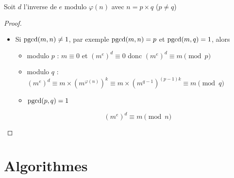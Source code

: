 \begin{frame}

\begin{lemme}
Soit $d$ l'inverse de $e$ modulo $\varphi(n)$ avec $n=p\times q$ \quad ($p\not= q$)
\end{lemme}



\begin{proof}
\begin{itemize}
  \item Si $\mathop{\text{pgcd}}\nolimits(m,n)\not=1$, par exemple $\mathop{\text{pgcd}}\nolimits(m,n)=p$ et $\mathop{\text{pgcd}}\nolimits(m,q)=1$, alors %
\pause 
\vspace*{-1ex} 
\begin{itemize}
\item modulo $p$ : $m   \equiv  0 $ \pause \quad  et \quad $(m^e)^d \equiv  0 $ \pause \quad donc \quad $(m^e)^d \equiv  m   \pmod{p}$
\pause
\item modulo $q$ : $(m^e)^d  \equiv m \!\times\! (m^{\varphi(n)})^k \equiv m \!\times\! (m^{q-1})^{(p-1)k} \equiv m   \pmod{q}$
\pause 
\item $\mathop{\text{pgcd}}\nolimits(p,q)=1$
\vspace*{-4ex}

$$(m^e)^d  \equiv  m \pmod{n}$$
\qedhere
\end{itemize}

      
\end{itemize}
\end{proof}
\end{frame}



\section{Algorithmes}

